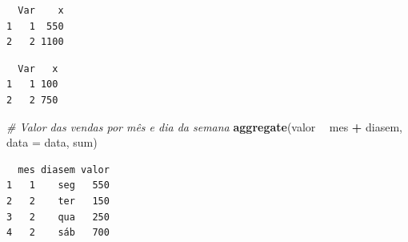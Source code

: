 \documentclass[12pt,brazil,oneside]{book}
\newenvironment{Shaded}{\begin{snugshade}}{\end{snugshade}}
\newcommand{\CommentTok}[1]{\textcolor[rgb]{0.56,0.35,0.01}{\textit{#1}}}
\newcommand{\DataTypeTok}[1]{\textcolor[rgb]{0.13,0.29,0.53}{#1}}
\newcommand{\KeywordTok}[1]{\textcolor[rgb]{0.13,0.29,0.53}{\textbf{#1}}}
\newcommand{\NormalTok}[1]{#1}
\newcommand{\OperatorTok}[1]{\textcolor[rgb]{0.81,0.36,0.00}{\textbf{#1}}}
\newcommand{\StringTok}[1]{\textcolor[rgb]{0.31,0.60,0.02}{#1}}
\begin{document}
\begin{Shaded}
\end{Shaded}

\begin{verbatim}
  Var    x
1   1  550
2   2 1100
\end{verbatim}

\begin{Shaded}
\end{Shaded}

\begin{verbatim}
  Var   x
1   1 100
2   2 750
\end{verbatim}

\begin{Shaded}
\begin{Highlighting}[]
\CommentTok{# Valor das vendas por mês e dia da semana }
\KeywordTok{aggregate}\NormalTok{(valor }\OperatorTok{~}\StringTok{ }\NormalTok{mes }\OperatorTok{+}\StringTok{ }\NormalTok{diasem, }\DataTypeTok{data =}\NormalTok{ data, sum)}
\end{Highlighting}
\end{Shaded}

\begin{verbatim}
  mes diasem valor
1   1    seg   550
2   2    ter   150
3   2    qua   250
4   2    sáb   700
\end{verbatim}

\begin{Shaded}
\end{Shaded}
\end{document}

